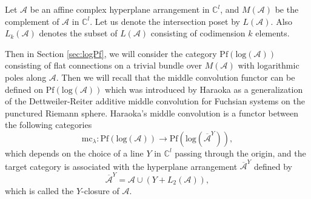 \documentclass[a4paper,12pt]{article}
\newcommand{\C}{\mathbb{C}}
\theoremstyle{definition}
\theoremstyle{remark}
\begin{document}
Let $\mathcal{A}$ be an affine complex hyperplane arrangement in $\C^{l}$, 
and $M(\mathcal{A})$ be the complement of $\mathcal{A}$ in $\C^{l}$.
Let us denote the intersection poset 
by $L(\mathcal{A})$. Also $L_{k}(\mathcal{A})$ denotes
the subset of $L(\mathcal{A})$ consisting of codimension $k$ elements.

Then in Section \ref{sec:logPf}, we will 
consider the category $\mathrm{Pf}(\mathrm{log}(\mathcal{A}))$
consisting of flat connections on a trivial bundle over $M(\mathcal{A})$ with logarithmic poles along $\mathcal{A}$.
Then we will recall that
the middle convolution functor can be defined  
on $\mathrm{Pf}(\mathrm{log}(\mathcal{A}))$
which was introduced by Haraoka \cite{Har1} 
as a generalization of the Dettweiler-Reiter additive middle 
convolution for Fuchsian systems on the punctured Riemann sphere.
Haraoka's middle convolution is a functor between the following categories
\[
	\mathrm{mc}_{\lambda}\colon \mathrm{Pf}(\mathrm{log}(\mathcal{A}))\to 
	\mathrm{Pf}(\mathrm{log}(\overline{\mathcal{A}}^{Y})),
\]
which depends on the choice of a line $Y$ in $\C^{l}$ passing through the origin,
and the target category is associated with the hyperplane arrangement 
$\overline{\mathcal{A}}^{Y}$ defined by
\[ 
\overline{\mathcal{A}}^{Y}=\mathcal{A}\cup (Y+L_{2}(\mathcal{A})),
\]
which is called the $Y$-closure of $\mathcal{A}$.
	 
\end{document}
